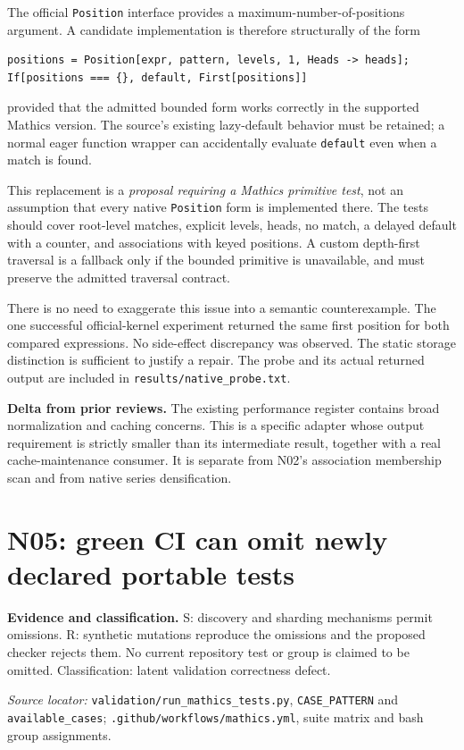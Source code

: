 \documentclass[11pt,letterpaper]{article}
\newcommand{\code}[1]{\nolinkurl{#1}}
\newcommand{\source}[1]{\par\textit{Source locator:} #1\par}
\newcommand{\status}[1]{\par\textbf{Evidence and classification.} #1\par}
\newcommand{\novelty}[1]{\par\textbf{Delta from prior reviews.} #1\par}
\begin{document}
The official \code{Position} interface provides a maximum-number-of-positions
argument. A candidate implementation is therefore structurally of the form
\begin{lstlisting}
positions = Position[expr, pattern, levels, 1, Heads -> heads];
If[positions === {}, default, First[positions]]
\end{lstlisting}
provided that the admitted bounded form works correctly in the supported
Mathics version. The source's existing lazy-default behavior must be retained;
a normal eager function wrapper can accidentally evaluate \code{default}
even when a match is found. \cite{wl-position,wl-firstposition}

This replacement is a \emph{proposal requiring a Mathics primitive test}, not
an assumption that every native \code{Position} form is implemented there.
The tests should cover root-level matches, explicit levels, heads, no match,
a delayed default with a counter, and associations with keyed positions.
A custom depth-first traversal is a fallback only if the bounded primitive
is unavailable, and must preserve the admitted traversal contract.

There is no need to exaggerate this issue into a semantic counterexample.
The one successful official-kernel experiment returned the same first
position for both compared expressions. No side-effect discrepancy was
observed. The static storage distinction is sufficient to justify a repair.
The probe and its actual returned output are included in
\code{results/native_probe.txt}.

\novelty{The existing performance register contains broad normalization
and caching concerns. This is a specific adapter whose output requirement
is strictly smaller than its intermediate result, together with a real
cache-maintenance consumer. It is separate from N02's association membership
scan and from native series densification.}

\section{N05: green CI can omit newly declared portable tests}
\label{sec:inventory}
\status{S: discovery and sharding mechanisms permit omissions. R: synthetic
mutations reproduce the omissions and the proposed checker rejects them.
No current repository test or group is claimed to be omitted. Classification:
latent validation correctness defect.}
\source{\code{validation/run_mathics_tests.py}, \code{CASE_PATTERN} and
\code{available_cases}; \code{.github/workflows/mathics.yml}, suite matrix
and bash group assignments. \cite{repo-runner,repo-workflow}}
\end{document}
